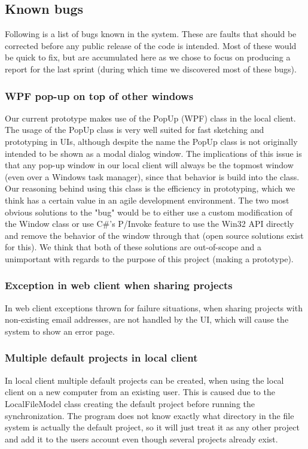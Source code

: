 \subsection{Known bugs}
\label{sec:bugs}

Following is a list of bugs known in the system. These are faults that should be corrected before any public
release of the code is intended. Most of these would be quick to fix, but are accumulated here as we chose
to focus on producing a report for the last sprint (during which time we discovered most of these bugs).

\subsubsection{WPF pop-up on top of other windows}
Our current prototype makes use of the PopUp (WPF) class in the local client. The usage of the PopUp class is very well suited for fast sketching and prototyping in UIs, although despite the name the PopUp class is not originally intended to be shown as a modal dialog window. The implications of this issue is that any pop-up window in our local client will always be the topmost window (even over a Windows task manager), since that behavior is build into the class. Our reasoning behind using this class is the efficiency in prototyping, which we think has a certain value in an agile development environment. The two most obvious solutions to the "bug" would be to either use a custom modification of the Window class or use C\#'s P/Invoke feature to use the Win32 API directly and remove the behavior of the window through that (open source solutions exist for this). We think that both of these solutions are out-of-scope and a unimportant with regards to the purpose of this project (making a prototype).

\subsubsection{Exception in web client when sharing projects}
In web client exceptions thrown for failure situations, when sharing projects with non-existing email addresses, are not handled by the UI, which will cause the system to show an error page.

\subsubsection{Multiple default projects in local client}
In local client multiple default projects can be created, when using the local client on a new computer from an existing user. This is caused due to the LocalFileModel class creating the default project before running the synchronization. The program does not know exactly what directory in the file system is actually the default project, so it will just treat it as any other project and add it to the users account even though several projects already exist.

